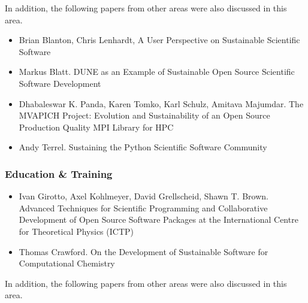 \documentclass[11pt, oneside]{amsart}
\begin{document}
In addition, the following papers from other areas were also discussed
in this area.

\begin{itemize}

\item Brian Blanton, Chris Lenhardt, A User Perspective on Sustainable
  Scientific Software~\cite{Blanton_WSSSPE}

\item Markus Blatt. DUNE as an Example of Sustainable Open Source
  Scientific Software Development~\cite{Blatt_WSSSPE}

\item Dhabaleswar K. Panda, Karen Tomko, Karl Schulz, Amitava
  Majumdar. The MVAPICH Project: Evolution and Sustainability of an
  Open Source Production Quality MPI Library for HPC~\cite{Panda_WSSSPE}

\item Andy Terrel. Sustaining the Python Scientific Software Community~\cite{Terrel_WSSSPE}

\end{itemize}

\subsubsection*{Education \& Training}

\begin{itemize}

\item Ivan Girotto, Axel Kohlmeyer, David Grellscheid, Shawn
  T. Brown. Advanced Techniques for Scientific Programming and
  Collaborative Development of Open Source Software Packages at the
  International Centre for Theoretical Physics (ICTP)~\cite{Girotto_WSSSPE}

\item Thomas Crawford. On the Development of Sustainable Software for
  Computational Chemistry~\cite{Crawford_WSSSPE}

\end{itemize}

In addition, the following papers from other areas were also discussed
in this area.
\end{document}
